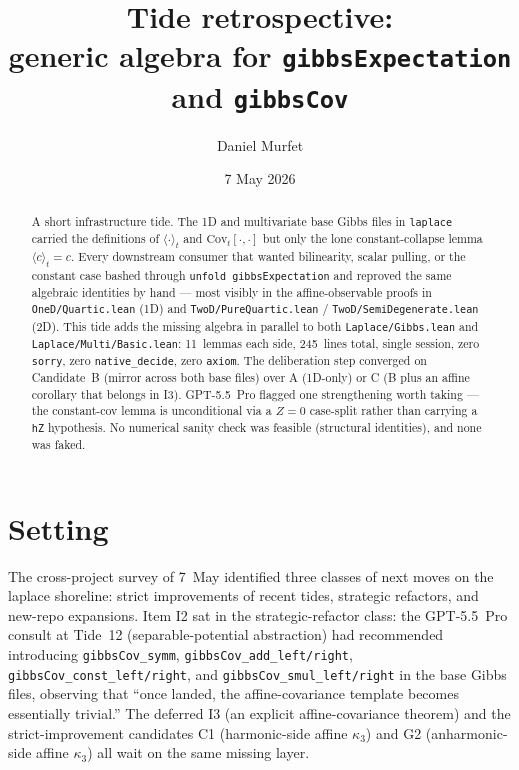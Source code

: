 \documentclass[11pt]{article}
\title{Tide retrospective:\\generic algebra for \texttt{gibbsExpectation} and \texttt{gibbsCov}}
\author{Daniel Murfet}
\date{7 May 2026}
\begin{document}
\maketitle

\begin{abstract}
A short infrastructure tide. The 1D and multivariate base Gibbs files
in \texttt{laplace} carried the definitions of $\langle\cdot\rangle_t$
and $\mathrm{Cov}_t[\cdot,\cdot]$ but only the lone constant-collapse
lemma $\langle c\rangle_t = c$. Every downstream consumer that wanted
bilinearity, scalar pulling, or the constant case bashed through
\texttt{unfold gibbsExpectation} and reproved the same algebraic
identities by hand — most visibly in the affine-observable proofs in
\texttt{OneD/Quartic.lean} (1D) and \texttt{TwoD/PureQuartic.lean} /
\texttt{TwoD/SemiDegenerate.lean} (2D). This tide adds the missing
algebra in parallel to both \texttt{Laplace/Gibbs.lean} and
\texttt{Laplace/Multi/Basic.lean}: 11~lemmas each side, 245~lines
total, single session, zero \texttt{sorry}, zero
\texttt{native\_decide}, zero \texttt{axiom}. The deliberation step
converged on Candidate~B (mirror across both base files) over A
(1D-only) or C (B plus an affine corollary that belongs in I3).
GPT-5.5~Pro flagged one strengthening worth taking — the constant-cov
lemma is unconditional via a $Z=0$ case-split rather than carrying a
\texttt{hZ} hypothesis. No numerical sanity check was feasible
(structural identities), and none was faked.
\end{abstract}

\section{Setting}

The cross-project survey of 7~May identified three classes of next
moves on the laplace shoreline: strict improvements of recent tides,
strategic refactors, and new-repo expansions. Item I2 sat in the
strategic-refactor class: the GPT-5.5~Pro consult at Tide~12
(separable-potential abstraction) had recommended introducing
\texttt{gibbsCov\_symm}, \texttt{gibbsCov\_add\_left/right},
\texttt{gibbsCov\_const\_left/right}, and
\texttt{gibbsCov\_smul\_left/right} in the base Gibbs files, observing
that ``once landed, the affine-covariance template becomes essentially
trivial.'' The deferred I3 (an explicit affine-covariance theorem)
and the strict-improvement candidates C1 (harmonic-side affine
$\kappa_3$) and G2 (anharmonic-side affine $\kappa_3$) all wait on the
same missing layer.
\end{document}
